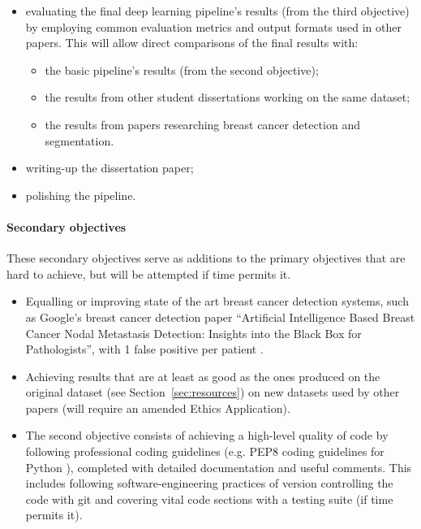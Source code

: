 \documentclass[letterpaper,12pt]{article}
\begin{document}
\begin{itemize}
\begin{itemize}
        \item evaluating the final deep learning pipeline's results (from the third objective) by employing common evaluation metrics and output formats used in other papers. This will allow direct comparisons of the final results with:
        \begin{itemize}
            \item the basic pipeline's results (from the second objective);
            \item the results from other student dissertations working on the same dataset;
            \item the results from papers researching breast cancer detection and segmentation.
        \end{itemize}
        \item writing-up the dissertation paper;
        \item polishing the pipeline.
    \end{itemize}
\end{itemize}

\paragraph{Secondary objectives}  

These secondary objectives serve as additions to the primary objectives that are hard to achieve, but will be attempted if time permits it.

\begin{itemize}
    \item Equalling or improving state of the art breast cancer detection systems, such as Google's breast cancer detection paper ``Artificial Intelligence Based Breast Cancer Nodal Metastasis Detection: Insights into the Black Box for Pathologists'', with 1 false positive per patient \cite{Liu2018}.
    \item Achieving results that are at least as good as the ones produced on the original dataset (see Section~\ref{sec:resources}) on new datasets used  by other papers (will require an amended Ethics Application).
    \item The second objective consists of achieving a high-level quality of code by following professional coding guidelines (e.g. PEP8 coding guidelines for Python \cite{pep8}), completed with detailed documentation and useful comments. This includes following software-engineering practices of version controlling the code with git and covering vital code sections with a testing suite (if time permits it).
\end{itemize}
\end{document}
